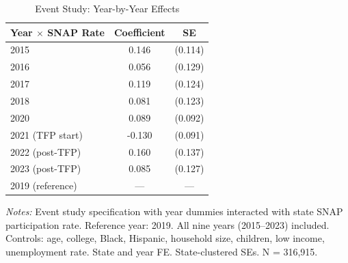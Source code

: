 \begin{table}[H]
\centering
\caption{Event Study: Year-by-Year Effects}
\label{tab:eventstudy}
\begin{threeparttable}
\begin{tabular}{lcc}
\toprule
Year $\times$ SNAP Rate & Coefficient & SE \\
\midrule
2015 & 0.146 & (0.114) \\
2016 & 0.056 & (0.129) \\
2017 & 0.119 & (0.124) \\
2018 & 0.081 & (0.123) \\
2020 & 0.089 & (0.092) \\
2021 (TFP start) & -0.130 & (0.091) \\
2022 (post-TFP) & 0.160 & (0.137) \\
2023 (post-TFP) & 0.085 & (0.127) \\
\midrule
2019 (reference) & --- & --- \\
\bottomrule
\end{tabular}
\begin{tablenotes}[flushleft]
\small
\item \textit{Notes:} Event study specification with year dummies interacted with state SNAP participation rate. Reference year: 2019. All nine years (2015--2023) included. Controls: age, college, Black, Hispanic, household size, children, low income, unemployment rate. State and year FE. State-clustered SEs. N = 316,915.
\end{tablenotes}
\end{threeparttable}
\end{table}
